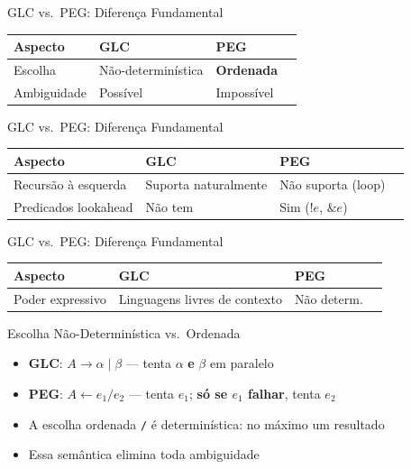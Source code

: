 \begin{frame}{GLC vs.~PEG: Diferença Fundamental}

    \begin{table}
        \begin{tabular}{l l l l}
            \hline
            Aspecto & GLC & PEG \\
            \hline
            Escolha & Não-determinística & \textbf{Ordenada} \\
            Ambiguidade & Possível & Impossível \\
            \hline
        \end{tabular}
    \end{table}
\end{frame}

\begin{frame}{GLC vs.~PEG: Diferença Fundamental}

    \begin{table}
        \begin{tabular}{l l l l}
            \hline
            Aspecto & GLC & PEG \\
            \hline
            Recursão à esquerda & Suporta naturalmente & Não suporta (loop) \\
            Predicados lookahead & Não tem & Sim (\(!e\), \(\&e\)) \\
            \hline
        \end{tabular}
    \end{table}
\end{frame}

\begin{frame}{GLC vs.~PEG: Diferença Fundamental}

    \begin{table}
        \begin{tabular}{l l l l}
            \hline
            Aspecto & GLC & PEG \\
            \hline
            Poder expressivo & Linguagens livres de contexto & Não determ. \\
            \hline
        \end{tabular}
    \end{table}
\end{frame}

\begin{frame}[fragile]{Escolha Não-Determinística vs.~Ordenada}

    \begin{itemize}

        \item
        \textbf{GLC}: \(A \to \alpha \mid \beta\) --- tenta \(\alpha\)
        \textbf{e} \(\beta\) em paralelo
        \item
        \textbf{PEG}: \(A \leftarrow e_1 / e_2\) --- tenta \(e_1\); \textbf{só
        se \(e_1\) falhar}, tenta \(e_2\)
        \item
        A escolha ordenada \texttt{/} é determinística: no
        máximo um resultado
        \item
        Essa semântica elimina toda ambiguidade
    \end{itemize}
\end{frame}



